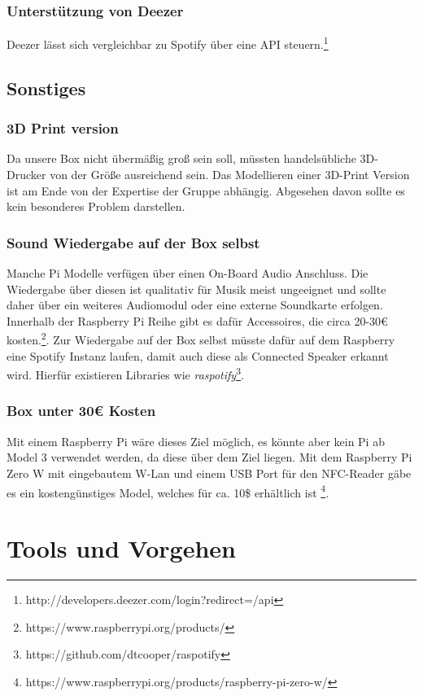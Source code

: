 \documentclass[10pt, a4paper]{article}
\begin{document}
\begin{onehalfspace}
\subsubsection{Unterstützung von Deezer}
Deezer lässt sich vergleichbar zu Spotify über eine API steuern.\footnote{http://developers.deezer.com/login?redirect=/api}

\subsection{Sonstiges}
\subsubsection{3D Print version}
Da unsere Box nicht übermäßig groß sein soll, müssten handelsübliche 3D-Drucker von der Größe ausreichend sein.
Das Modellieren einer 3D-Print Version ist am Ende von der Expertise der Gruppe abhängig.
Abgesehen davon sollte es kein besonderes Problem darstellen.

\subsubsection{Sound Wiedergabe auf der Box selbst}
Manche Pi Modelle verfügen über einen On-Board Audio Anschluss.
Die Wiedergabe über diesen ist qualitativ für Musik meist ungeeignet und sollte daher über ein weiteres Audiomodul oder eine externe Soundkarte erfolgen.
Innerhalb der Raspberry Pi Reihe gibt es dafür Accessoires, die circa 20-30€ kosten.\footnote{https://www.raspberrypi.org/products/}.
Zur Wiedergabe auf der Box selbst müsste dafür auf dem Raspberry eine Spotify Instanz laufen, damit auch diese als Connected Speaker erkannt wird.
Hierfür existieren Libraries wie \textit{raspotify}\footnote{https://github.com/dtcooper/raspotify}.

\subsubsection{Box unter 30€ Kosten}
Mit einem Raspberry Pi wäre dieses Ziel möglich, es könnte aber kein Pi ab Model 3 verwendet werden, da diese über dem Ziel liegen.
Mit dem Raspberry Pi Zero W mit eingebautem W-Lan und einem USB Port für den NFC-Reader gäbe es ein kostengünstiges Model, welches für ca. 10\$ erhältlich ist \footnote{https://www.raspberrypi.org/products/raspberry-pi-zero-w/}.

\section{Tools und Vorgehen}

\end{onehalfspace}
\end{document}
